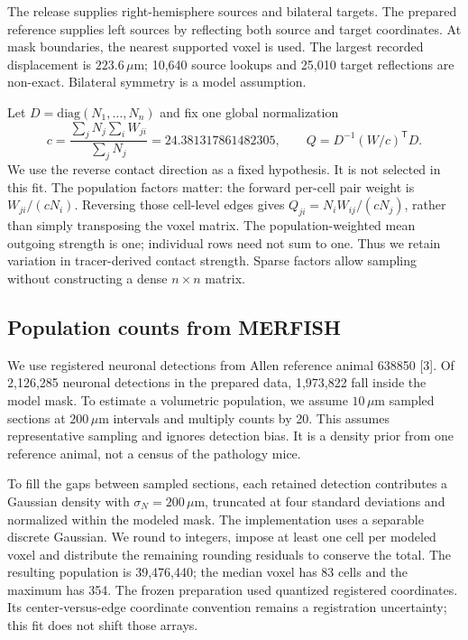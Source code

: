 \documentclass[10pt]{article}
\newcommand{\um}{\,\mu\mathrm{m}}\newcommand{\E}{\mathbb{E}}
\begin{document}
The release supplies right-hemisphere sources and bilateral targets. The prepared reference supplies left sources by reflecting both source and target coordinates. At mask boundaries, the nearest supported voxel is used. The largest recorded displacement is $223.6\um$; 10,640 source lookups and 25,010 target reflections are non-exact. Bilateral symmetry is a model assumption.

Let $D=\mathrm{diag}(N_1,\ldots,N_n)$ and fix one global normalization
\begin{equation}
 c=\frac{\sum_jN_j\sum_iW_{ji}}{\sum_jN_j}
   =24.381317861482305,\qquad
 Q=D^{-1}(W/c)^\mathsf{T}D.\label{eq:q}
\end{equation}
We use the reverse contact direction as a fixed hypothesis. It is not selected in this fit. The population factors matter: the forward per-cell pair weight is $W_{ji}/(cN_i)$. Reversing those cell-level edges gives $Q_{ji}=N_iW_{ij}/(cN_j)$, rather than simply transposing the voxel matrix. The population-weighted mean outgoing strength is one; individual rows need not sum to one. Thus we retain variation in tracer-derived contact strength. Sparse factors allow sampling without constructing a dense $n\times n$ matrix.

\subsection{Population counts from MERFISH}
We use registered neuronal detections from Allen reference animal 638850 [3]. Of 2,126,285 neuronal detections in the prepared data, 1,973,822 fall inside the model mask. To estimate a volumetric population, we assume $10\um$ sampled sections at $200\um$ intervals and multiply counts by 20. This assumes representative sampling and ignores detection bias. It is a density prior from one reference animal, not a census of the pathology mice.

To fill the gaps between sampled sections, each retained detection contributes a Gaussian density with $\sigma_N=200\um$, truncated at four standard deviations and normalized within the modeled mask. The implementation uses a separable discrete Gaussian. We round to integers, impose at least one cell per modeled voxel and distribute the remaining rounding residuals to conserve the total. The resulting population is 39,476,440; the median voxel has 83 cells and the maximum has 354. The frozen preparation used quantized registered coordinates. Its center-versus-edge coordinate convention remains a registration uncertainty; this fit does not shift those arrays.
\end{document}
